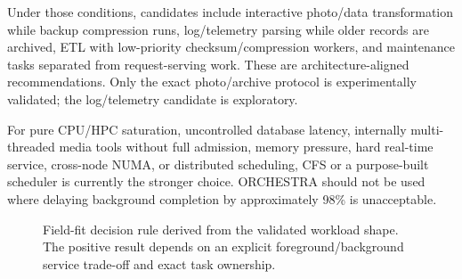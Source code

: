 \documentclass[10pt,letterpaper,twocolumn]{article}
\begin{document}
Under those conditions, candidates include interactive photo/data transformation while backup compression runs, log/telemetry parsing while older records are archived, ETL with low-priority checksum/compression workers, and maintenance tasks separated from request-serving work. These are architecture-aligned recommendations. Only the exact photo/archive protocol is experimentally validated; the log/telemetry candidate is exploratory.

For pure CPU/HPC saturation, uncontrolled database latency, internally multi-threaded media tools without full admission, memory pressure, hard real-time service, cross-node NUMA, or distributed scheduling, CFS or a purpose-built scheduler is currently the stronger choice. ORCHESTRA should not be used where delaying background completion by approximately 98\% is unacceptable.

\begin{figure}[t]
\centering
{}
\caption{Field-fit decision rule derived from the validated workload shape. The positive result depends on an explicit foreground/background service trade-off and exact task ownership.}
\label{fig:use-case}
\end{figure}
\end{document}
